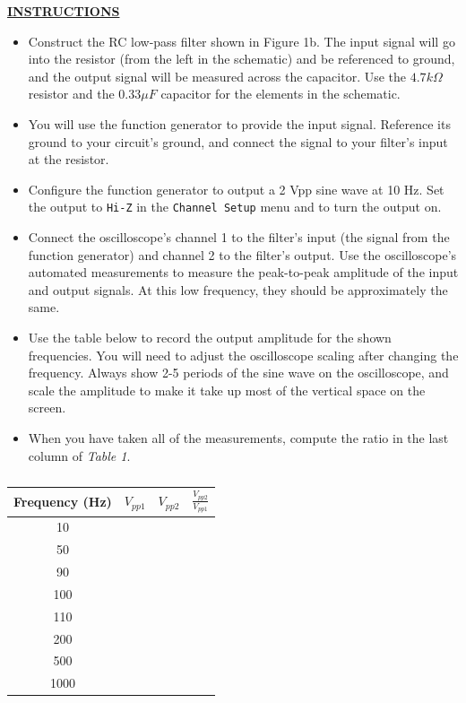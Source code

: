 \documentclass[12pt]{article}
\begin{document}
\textbf{\underline{INSTRUCTIONS}}
\begin{itemize}
    \item Construct the RC low-pass filter shown in Figure 1b.  The input signal will go into the resistor (from the left in the schematic) and be referenced to ground, and the output signal will be measured across the capacitor. Use the $4.7k\Omega$ resistor and the $0.33\mu F$ capacitor for the elements in the schematic.
    \item You will use the function generator to provide the input signal.  Reference its ground to your circuit's ground, and connect the signal to your filter's input at the resistor.
    \item Configure the function generator to output a 2 Vpp sine wave at 10 Hz.  Set the output to \texttt{Hi-Z} in the \texttt{Channel Setup} menu and to turn the output on.
    \item Connect the oscilloscope's channel 1 to the filter's input (the signal from the function generator) and channel 2 to the filter's output.  Use the oscilloscope's automated measurements to measure the peak-to-peak amplitude of the input and output signals.  At this low frequency, they should be approximately the same.
    \item Use the table below to record the output amplitude for the shown frequencies.  You will need to adjust the oscilloscope scaling after changing the frequency.  Always show 2-5 periods of the sine wave on the oscilloscope, and scale the amplitude to make it take up most of the vertical space on the screen.
    \item When you have taken all of the measurements, compute the ratio in the last column of \textit{Table 1}.
\end{itemize}

\begin{table}[H]
    \centering
    \begin{tabular}{|c||c|c|c|} 
        \hline
        Frequency (Hz) & \hspace{1cm} $V_{pp1}$ \hspace{1cm} & \hspace{1cm} $V_{pp2}$ \hspace{1cm} & \hspace{1cm} $\frac{V_{pp2}}{V_{pp1}}$ \hspace{1cm} \\ \hline \hline
        10   &     &    &     \\ \hline
        50     &     &   &      \\ \hline 
        90      &     &  &       \\ \hline 
        100     &     &     &   \\ \hline 
        110      &     &     &    \\ \hline 
        200      &     &    &   \\ \hline 
        500      &     &     &    \\ \hline 
        1000      &     &   &     \\ \hline 
        
    \end{tabular}
    \caption{}
\end{table}
\end{document}
